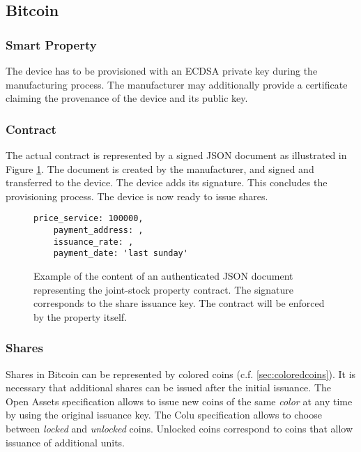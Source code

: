 \subsection{Bitcoin}

\subsubsection{Smart Property}

The device has to be provisioned with an ECDSA private key during the manufacturing process.
The manufacturer may additionally provide a certificate claiming the provenance of the device and its public key.

\subsubsection{Contract}

The actual contract is represented by a signed JSON document as illustrated in Figure \ref{lst:contract}. The document is created by the manufacturer, and  signed and transferred to the device. The device adds its signature. This concludes the provisioning process. The device is now ready to issue shares.

\begin{figure}
\label{lst:contract}
\begin{lstlisting}[breaklines]
	price_service: 100000,
	payment_address: ,
	issuance_rate: ,
	payment_date: 'last sunday'
\end{lstlisting}
\caption{Example of the content of an authenticated JSON document representing the joint-stock property contract. The signature corresponds to the share issuance key. The contract will be enforced by the property itself.}
\end{figure}


\subsubsection{Shares}

Shares in Bitcoin can be represented by colored coins (c.f. \ref{sec:coloredcoins}). It is necessary that additional shares can be issued after the initial issuance. The Open Assets specification allows to issue new coins of the same \emph{color} at any time by using the original issuance key. The Colu specification allows to choose between \emph{locked} and \emph{unlocked} coins. Unlocked coins correspond to coins that allow issuance of additional units.

